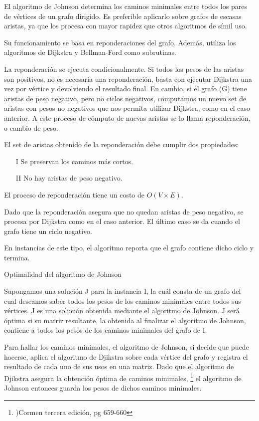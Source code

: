 \documentclass[../tp2_grupo404.tex]{subfiles}
\begin{document}
El algoritmo de Johnson determina los caminos minimales entre todos
los pares de vértices de un grafo dirigido. Es preferible aplicarlo
sobre grafos de escasas aristas, ya que los procesa con mayor
rapidez que otros algoritmos de símil uso.

Su funcionamiento se basa en reponderaciones del grafo. Además,
utiliza los algoritmos de Dijkstra y Bellman-Ford como subrutinas.

La reponderación se ejecuta condicionalmente. Si todos los pesos
de las aristas son positivos, no es necesaria una reponderación,
basta con ejecutar Dijkstra una vez por vértice y devolviendo el
resultado final. En cambio, si el grafo (G) tiene aristas de peso
negativo, pero no ciclos negativos, computamos un nuevo set de
aristas con pesos no negativos que nos permita utilizar Dijkstra,
como en el caso anterior. A este proceso de cómputo de nuevas
aristas se lo llama reponderación, o cambio de peso.

El set de aristas obtenido de la reponderación debe cumplir dos
propiedades:
\begin{enumerate}
    \item[I] Se preservan los caminos más cortos.
    \item[II] No hay aristas de peso negativo.
\end{enumerate}

El proceso de reponderación tiene un costo de $O(V\times E)$.

Dado que la reponderación asegura que no quedan aristas de peso
negativo, se procesa por Dijkstra como en el caso anterior.
El último caso se da cuando el grafo tiene un ciclo negativo.

En instancias de este tipo, el algoritmo reporta que el grafo
contiene dicho ciclo y termina.

Optimalidad del algoritmo de Johnson

Supongamos una solución J para la instancia I, la cuál consta de un grafo del cual deseamos saber todos los
pesos de los caminos minimales entre todos sus vértices. J es una solución obtenida mediante el algoritmo de
Johnson. J será óptima si su matriz resultante, la obtenida al finalizar el algoritmo de Johnson, contiene a
todos los pesos de los caminos minimales del grafo de I.

Para hallar los caminos minimales, el algoritmo de Johnson, si decide que puede hacerse, aplica el algoritmo
de Djikstra sobre cada vértice del grafo y registra el resultado de cada uno de sus usos en una matriz. Dado
que el algoritmo de Djikstra asegura la obtención óptima de caminos minimales,
\footnote{)Cormen tercera edición, pg 659-660}
el algoritmo de Johnson entonces guarda los pesos de dichos caminos minimales.
\end{document}
